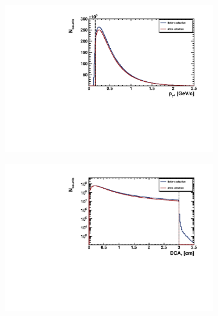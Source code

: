 \begin{figure}[ht]
    \begin{subfigure}{.49\textwidth}
        \centering
        \includegraphics[width=1.\linewidth]{Figures/Pt.pdf}
    \end{subfigure}
    \begin{subfigure}{.49\textwidth}
        \centering
        \includegraphics[width=1.\linewidth]{Figures/DCA.pdf}
    \end{subfigure}
    \\
    \begin{subfigure}{.49\textwidth}
        \centering

\end{subfigure}
\end{figure}
